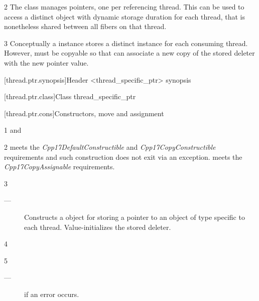 \documentclass[fontsize=10pt,paper=A4,pagesize,DIV=15]{scrartcl}
\begin{document}
2 The \tptr class manages pointers, one per referencing thread. This can be
used to access a distinct object with dynamic storage duration for each
thread, that is nonetheless shared between all fibers on that thread.

3 Conceptually a \tptr{} instance stores a distinct
 instance for each consuming thread.
However,  must be copyable so that  can associate
a new copy of the stored deleter with the new pointer value.

[thread.ptr.synopsis]{Header <thread\_specific\_ptr> synopsis}



[thread.ptr.class]{Class thread\_specific\_ptr}


[thread.ptr.cons]{Constructors, move and assignment}


1 \constraints
{} and 

2 \precond
{} meets the \emph{Cpp17DefaultConstructible} and
\emph{Cpp17CopyConstructible} requirements and such construction does not exit
via an exception.
 meets the \emph{Cpp17CopyAssignable} requirements.

3 \effects
\begin{description}
    \item[---] Constructs a  object for storing a
               pointer to an object of type  specific to each thread.
               Value-initializes the stored deleter.
\end{description}

4 \postcond
{}

5 \except
\begin{description}
    \item[---]  if an error occurs.
\end{description}
\end{document}

